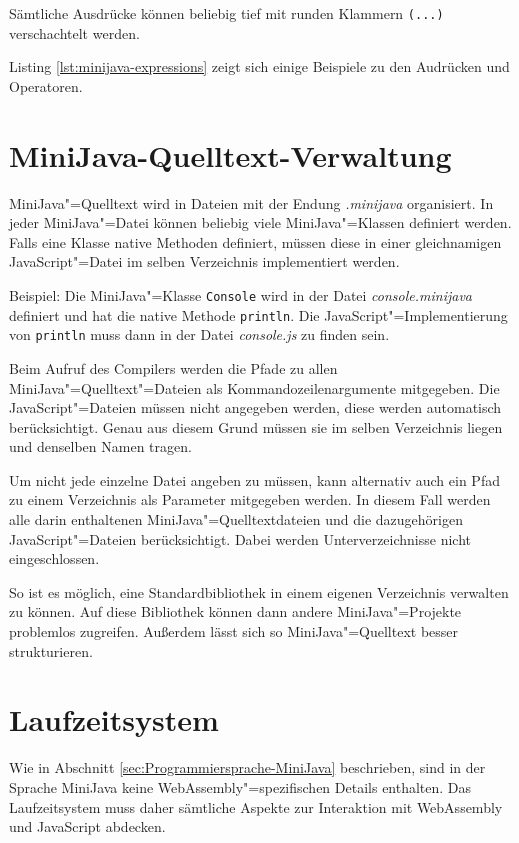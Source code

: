 Sämtliche Ausdrücke können beliebig tief mit runden Klammern \lstinline{(...)} verschachtelt werden.

Listing \ref{lst:minijava-expressions} zeigt sich einige Beispiele zu den Audrücken und Operatoren.



\section{MiniJava-Quelltext-Verwaltung}

MiniJava"=Quelltext wird in Dateien mit der Endung \emph{.minijava} organisiert. In jeder MiniJava"=Datei können beliebig viele MiniJava"=Klassen definiert werden. Falls eine Klasse native Methoden definiert, müssen diese in einer gleichnamigen JavaScript"=Datei im selben Verzeichnis implementiert werden.

Beispiel: Die MiniJava"=Klasse \lstinline{Console} wird in der Datei \emph{console.minijava} definiert und hat die native Methode \lstinline{println}. Die JavaScript"=Implementierung von \lstinline{println} muss dann in der Datei \emph{console.js} zu finden sein.

Beim Aufruf des Compilers werden die Pfade zu allen MiniJava"=Quelltext"=Dateien als Kommandozeilenargumente mitgegeben. Die JavaScript"=Dateien müssen nicht angegeben werden, diese werden automatisch berücksichtigt. Genau aus diesem Grund müssen sie im selben Verzeichnis liegen und denselben Namen tragen.

Um nicht jede einzelne Datei angeben zu müssen, kann alternativ auch ein Pfad zu einem Verzeichnis als Parameter mitgegeben werden. In diesem Fall werden alle darin enthaltenen MiniJava"=Quelltextdateien und die dazugehörigen JavaScript"=Dateien berücksichtigt. Dabei werden Unterverzeichnisse nicht eingeschlossen.

So ist es möglich, eine Standardbibliothek in einem eigenen Verzeichnis verwalten zu können. Auf diese Bibliothek können dann andere MiniJava"=Projekte problemlos zugreifen. Außerdem lässt sich so MiniJava"=Quelltext besser strukturieren.

\section{Laufzeitsystem}

Wie in Abschnitt \ref{sec:Programmiersprache-MiniJava} beschrieben, sind in der Sprache MiniJava keine WebAssembly"=spezifischen Details enthalten. Das Laufzeitsystem muss daher sämtliche Aspekte zur Interaktion mit WebAssembly und JavaScript abdecken.

